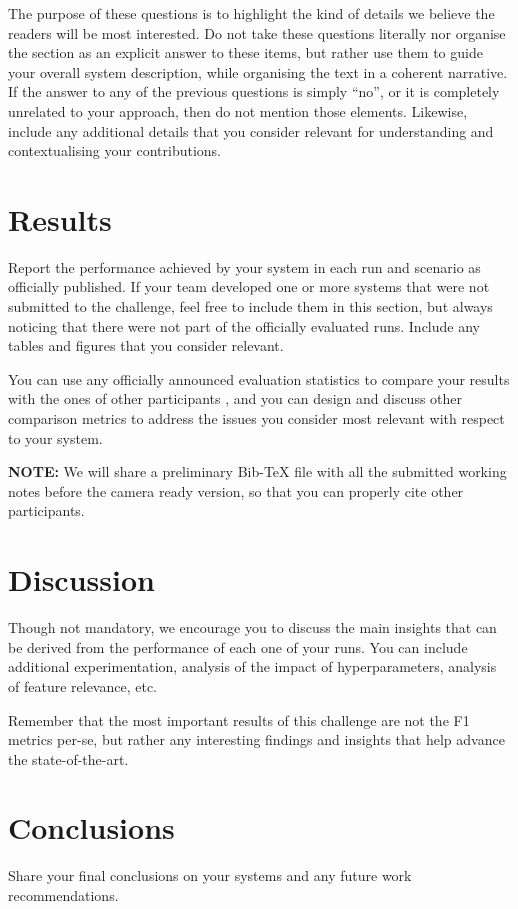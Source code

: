 \documentclass[
]{ceurart}
\begin{document}
The purpose of these questions is to highlight the kind
of details we believe the readers will be most interested. 
Do not take these questions literally nor organise the section as an explicit answer
to these items, but rather use them to guide your overall system
description, while organising the text in a coherent narrative.
If the answer to any of the previous questions is simply ``no'', or it is completely unrelated
to your approach, then do not mention those elements.
Likewise, include any additional details that you consider relevant for understanding and
contextualising your contributions.

\section{Results}

Report the performance achieved by your system in each run and scenario as officially published.
If your team developed one or more systems that were not submitted to the challenge, feel free to include them in this section, but always noticing that there were not part of the officially evaluated runs.
Include any tables and figures that you consider relevant.

You can use any officially announced evaluation statistics to compare your results with the ones of other participants , and you can design and discuss other comparison metrics to address the
issues you consider most relevant with respect to your system.

\textbf{NOTE:} We will share a preliminary Bib-TeX file with all the submitted working notes before the camera ready version, so that you can properly cite other participants.

\section{Discussion}

Though not mandatory, we encourage you to discuss the main insights that can be derived from the performance of each one of your runs. You can include additional experimentation, analysis of the impact of hyperparameters, analysis of feature relevance, etc.

Remember that the most important results of this challenge are not the F1 metrics per-se, but rather
any interesting findings and insights that help advance the state-of-the-art.

\section{Conclusions}

Share your final conclusions on your systems and any future work recommendations.


\end{document}

